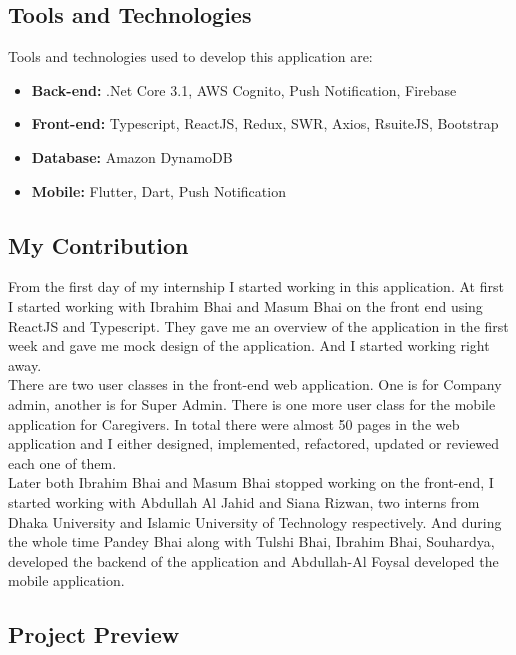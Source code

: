 \subsection{Tools and Technologies}

Tools and technologies used to develop this application are:

\begin{itemize}
    \item \textbf{Back-end:} .Net Core 3.1, AWS Cognito, Push Notification, Firebase
    \item \textbf{Front-end:} Typescript, ReactJS, Redux, SWR, Axios, RsuiteJS, Bootstrap
    \item \textbf{Database:} Amazon DynamoDB
    \item \textbf{Mobile:} Flutter, Dart, Push Notification
\end{itemize}

\subsection{My Contribution}

From the first day of my internship I started working in this application.
At first I started working with Ibrahim Bhai and Masum Bhai on the front end using ReactJS and Typescript.
They gave me an overview of the application in the first week and gave me mock design of the application.
And I started working right away.\\

There are two user classes in the front-end web application.
One is for Company admin, another is for Super Admin.
There is one more user class for the mobile application for Caregivers.
In total there were almost 50 pages in the web application and I either designed, implemented, refactored, updated or reviewed each one of them.\\

Later both Ibrahim Bhai and Masum Bhai stopped working on the front-end, I started working with Abdullah Al Jahid and Siana Rizwan, two interns from Dhaka University and Islamic University of Technology respectively.
And during the whole time Pandey Bhai along with Tulshi Bhai, Ibrahim Bhai, Souhardya, developed the backend of the application and Abdullah-Al Foysal developed the mobile application.

\subsection{Project Preview}

